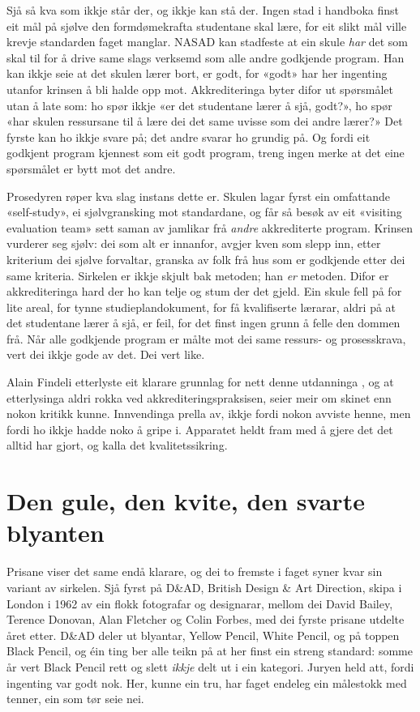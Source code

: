 Sjå så kva som ikkje står der, og ikkje kan stå der. Ingen stad i handboka finst eit mål på sjølve den formdømekrafta studentane skal lære, for eit slikt mål ville krevje standarden faget manglar. NASAD kan stadfeste at ein skule \emph{har} det som skal til for å drive same slags verksemd som alle andre godkjende program. Han kan ikkje seie at det skulen lærer bort, er godt, for «godt» har her ingenting utanfor krinsen å bli halde opp mot. Akkrediteringa byter difor ut spørsmålet utan å late som: ho spør ikkje «er det studentane lærer å sjå, godt?», ho spør «har skulen ressursane til å lære dei det same uvisse som dei andre lærer?» Det fyrste kan ho ikkje svare på; det andre svarar ho grundig på. Og fordi eit godkjent program kjennest som eit godt program, treng ingen merke at det eine spørsmålet er bytt mot det andre.

Prosedyren røper kva slag instans dette er. Skulen lagar fyrst ein omfattande «self-study», ei sjølvgransking mot standardane, og får så besøk av eit «visiting evaluation team» sett saman av jamlikar frå \emph{andre} akkrediterte program. Krinsen vurderer seg sjølv: dei som alt er innanfor, avgjer kven som slepp inn, etter kriterium dei sjølve forvaltar, granska av folk frå hus som er godkjende etter dei same kriteria. Sirkelen er ikkje skjult bak metoden; han \emph{er} metoden. Difor er akkrediteringa hard der ho kan telje og stum der det gjeld. Ein skule fell på for lite areal, for tynne studieplandokument, for få kvalifiserte lærarar, aldri på at det studentane lærer å sjå, er feil, for det finst ingen grunn å felle den dommen frå. Når alle godkjende program er målte mot dei same ressurs- og prosesskrava, vert dei ikkje gode av det. Dei vert like.

Alain Findeli etterlyste eit klarare grunnlag for nett denne utdanninga \autocite{findeli2001}, og at etterlysinga aldri rokka ved akkrediteringspraksisen, seier meir om skinet enn nokon kritikk kunne. Innvendinga prella av, ikkje fordi nokon avviste henne, men fordi ho ikkje hadde noko å gripe i. Apparatet heldt fram med å gjere det det alltid har gjort, og kalla det kvalitetssikring.

\section{Den gule, den kvite, den svarte blyanten}

Prisane viser det same endå klarare, og dei to fremste i faget syner kvar sin variant av sirkelen. Sjå fyrst på D\&AD, British Design \& Art Direction, skipa i London i 1962 av ein flokk fotografar og designarar, mellom dei David Bailey, Terence Donovan, Alan Fletcher og Colin Forbes, med dei fyrste prisane utdelte året etter. D\&AD deler ut blyantar, Yellow Pencil, White Pencil, og på toppen Black Pencil, og éin ting ber alle teikn på at her finst ein streng standard: somme år vert Black Pencil rett og slett \emph{ikkje} delt ut i ein kategori. Juryen held att, fordi ingenting var godt nok. Her, kunne ein tru, har faget endeleg ein målestokk med tenner, ein som tør seie nei.


